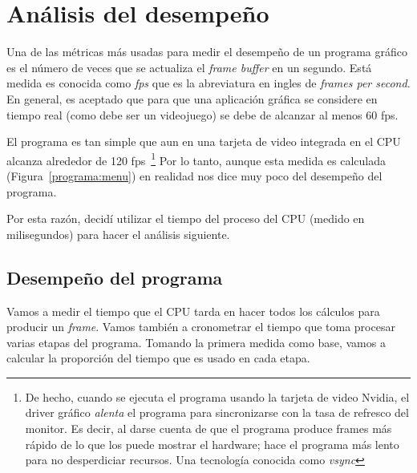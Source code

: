 \section{Análisis del desempeño}

Una de las métricas más usadas para medir el desempeño de un programa gráfico es el número de veces que se actualiza el \emph{\textenglish{frame buffer}} en un segundo.
Está medida es conocida como \emph{fps} que es la abreviatura en ingles de  \emph{\textenglish{frames per second}}.
En general, es aceptado que para que una aplicación gráfica se considere en tiempo real (como debe ser un videojuego) se debe de alcanzar al menos 60 fps.

El programa es tan simple que aun en una tarjeta de video integrada en el CPU alcanza alrededor de 120 fps~\footnote{De hecho, cuando se ejecuta el programa usando la tarjeta de video Nvidia, el driver gráfico \emph{alenta} el programa para sincronizarse con la tasa de refresco del monitor. Es decir, al darse cuenta de que el programa produce frames más rápido de lo que los puede mostrar el hardware; hace el programa más lento para no desperdiciar recursos. Una tecnología conocida como \emph{\textenglish{vsync}}}
Por lo tanto, aunque esta medida es calculada (Figura~\ref{programa:menu}) en realidad nos dice muy poco del desempeño del programa.

Por esta razón, decidí utilizar el tiempo del proceso del CPU (medido en milisegundos) para hacer el análisis siguiente.

\subsection{Desempeño del programa}

Vamos a medir el tiempo que el CPU tarda en hacer todos los cálculos para producir un \emph{\textenglish{frame}}.
Vamos también a cronometrar el tiempo que toma procesar varias etapas del programa.
Tomando la primera medida como base, vamos a calcular la proporción del tiempo que es usado en cada etapa.

